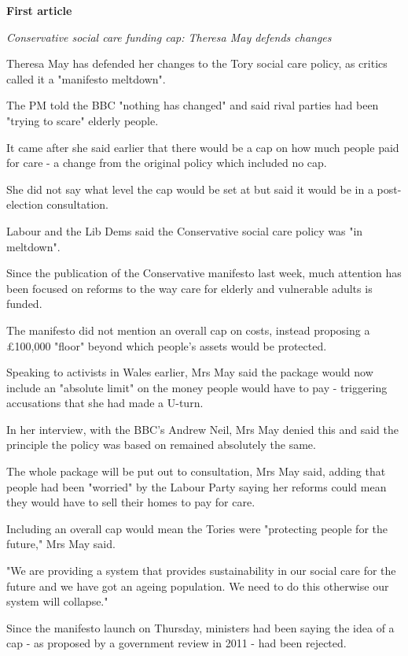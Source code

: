 \documentclass[12pt]{article}
\begin{document}
\textbf{First article}

\begin{mdframed}

\emph{Conservative social care funding cap: Theresa May defends changes} \cite{tmarticle}

Theresa May has defended her changes to the Tory social care policy, as critics called it a "manifesto meltdown".

The PM told the BBC "nothing has changed" and said rival parties had been "trying to scare" elderly people.

It came after she said earlier that there would be a cap on how much people paid for care - a change from the original policy which included no cap.

She did not say what level the cap would be set at but said it would be in a post-election consultation.

Labour and the Lib Dems said the Conservative social care policy was "in meltdown".

Since the publication of the Conservative manifesto last week, much attention has been focused on reforms to the way care for elderly and vulnerable adults is funded.

The manifesto did not mention an overall cap on costs, instead proposing a \pounds100,000 "floor" beyond which people's assets would be protected.

Speaking to activists in Wales earlier, Mrs May said the package would now include an "absolute limit" on the money people would have to pay - triggering accusations that she had made a U-turn.

In her interview, with the BBC's Andrew Neil, Mrs May denied this and said the principle the policy was based on remained absolutely the same.

The whole package will be put out to consultation, Mrs May said, adding that people had been "worried" by the Labour Party saying her reforms could mean they would have to sell their homes to pay for care.

Including an overall cap would mean the Tories were "protecting people for the future," Mrs May said.

"We are providing a system that provides sustainability in our social care for the future and we have got an ageing population. We need to do this otherwise our system will collapse."

Since the manifesto launch on Thursday, ministers had been saying the idea of a cap - as proposed by a government review in 2011 - had been rejected. \\

\end{mdframed}
\end{document}
